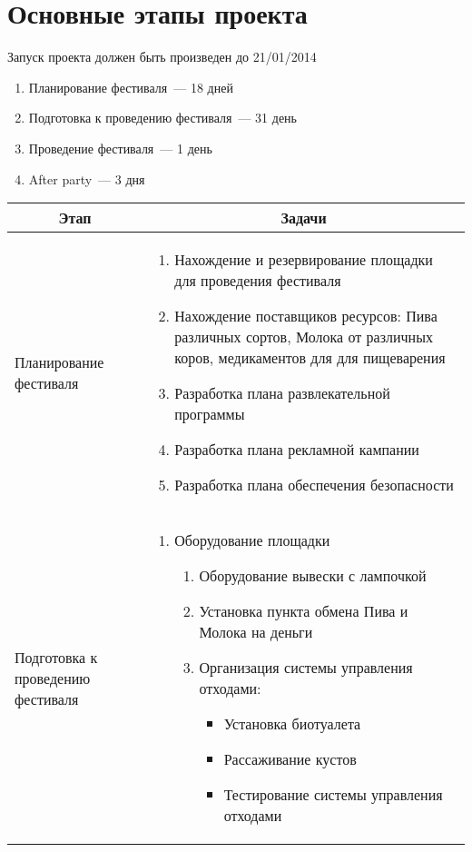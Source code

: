 \documentclass[a4paper,12pt]{article}
\begin{document}
\section{Основные этапы проекта}
Запуск проекта должен быть произведен до 21/01/2014
\begin{enumerate}
  \item{Планирование фестиваля~--- 18 дней}
  \item{Подготовка к проведению фестиваля~--- 31 день}
  \item{Проведение фестиваля~--- 1 день}
  \item{After party~--- 3 дня}
\end{enumerate}
\begin{center}
\begin{longtable}{|p{4cm}|p{11cm}|}
  \hline
  \multicolumn{1}{|c|}{\textbf{Этап}} & \multicolumn{1}{|c|}{\textbf{Задачи}}\\
  \hline
  \endhead
  Планирование фестиваля & 
  \begin{enumerate}
    \item Нахождение и резервирование площадки для проведения фестиваля
    \item Нахождение поставщиков ресурсов: Пива различных сортов, Молока от различных коров, медикаментов для для пищеварения 
    \item Разработка плана развлекательной программы 
    \item Разработка плана рекламной кампании
    \item Разработка плана обеспечения безопасности
  \end{enumerate} \\
  \hline
  Подготовка к проведению фестиваля & 
  \begin{enumerate}
    \item Оборудование площадки 
      \begin{enumerate}
        \item Оборудование вывески с лампочкой
        \item Установка пункта обмена Пива и Молока на деньги 
        \item Организация системы управления отходами:
          \begin{itemize}
            \item Установка биотуалета
            \item Рассаживание кустов
            \item Тестирование системы управления отходами
          \end{itemize}

\end{enumerate}
\end{enumerate}
\end{longtable}
\end{center}
\end{document}
